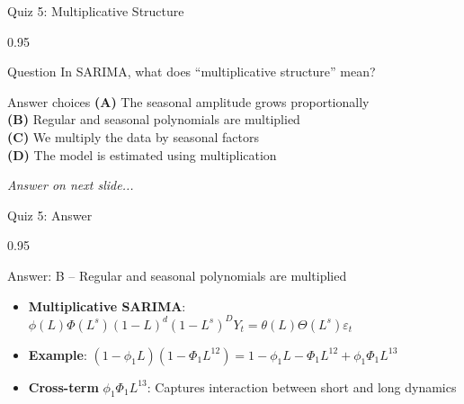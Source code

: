 \documentclass[9pt, aspectratio=169, t]{beamer}
\begin{document}
\begin{frame}{Quiz 5: Multiplicative Structure}
    \begin{cminipage}{0.95\textwidth}
    \begin{alertblock}{Question}
        In SARIMA, what does ``multiplicative structure'' mean?
    \end{alertblock}

    \vspace{0.4cm}

    \begin{block}{Answer choices}
        \textcolor{MainBlue}{\textbf{(A)}} The seasonal amplitude grows proportionally\\[3pt]
        \textcolor{MainBlue}{\textbf{(B)}} Regular and seasonal polynomials are multiplied\\[3pt]
        \textcolor{MainBlue}{\textbf{(C)}} We multiply the data by seasonal factors\\[3pt]
        \textcolor{MainBlue}{\textbf{(D)}} The model is estimated using multiplication
    \end{block}

    \vspace{0.5cm}

    \begin{center}
        \textit{Answer on next slide...}
    \end{center}
    \end{cminipage}
\end{frame}

\begin{frame}{Quiz 5: Answer}
    \begin{cminipage}{0.95\textwidth}
    \begin{exampleblock}{Answer: B -- Regular and seasonal polynomials are multiplied}
        \begin{itemize}
            \item \textbf{Multiplicative SARIMA}: $\phi(L)\Phi(L^s)(1-L)^d(1-L^s)^D Y_t = \theta(L)\Theta(L^s)\varepsilon_t$
            \item \textbf{Example}: $(1-\phi_1 L)(1-\Phi_1 L^{12}) = 1 - \phi_1 L - \Phi_1 L^{12} + \phi_1\Phi_1 L^{13}$
            \item \textbf{Cross-term} $\phi_1\Phi_1 L^{13}$: Captures interaction between short and long dynamics
        \end{itemize}
    \end{exampleblock}

    \end{cminipage}
\end{frame}
\end{document}
